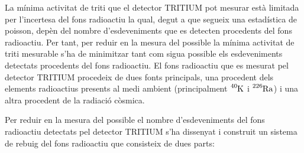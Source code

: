 La mínima activitat de triti que el detector TRITIUM pot mesurar està limitada per l'incertesa del fons radioactiu la qual, degut a que segueix una estadística de poisson, depèn del nombre d'esdeveniments que es detecten procedents del fons radioactiu. Per tant, per reduir en la mesura del possible la mínima activitat de triti mesurable s'ha de minimitzar tant com sigua possible els esdeveniments detectats procedents del fons radioactiu. El fons radioactiu que es mesurat pel detector TRITIUM procedeix de dues fonts principals, una procedent dels elements radioactius presents al medi ambient (principalment $\ce{^{40}K}$ i $\ce{^{226}Ra}$) i una altra procedent de la radiació còsmica.

Per reduir en la mesura del possible el nombre d'esdeveniments del fons radioactiu detectats pel detector TRITIUM s'ha dissenyat i construit un sistema de rebuig del fons radioactiu que consisteix de dues parts:

